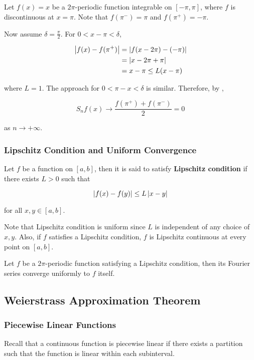 \documentclass[a4paper,12pt]{article}
\begin{document}
\begin{exm}
  Let $f(x)=x$ be a $2\pi$-periodic function integrable on $[-\pi,\pi]$, where $f$ is discontinuous at $x=\pi$. Note that $f(\pi^{-})=\pi$ and $f(\pi^{+})=-\pi$.\n
  
  Now assume $\delta=\frac{\pi}{2}$. For $0<x-\pi<\delta$,

  $$\begin{aligned}[t]
    \left| f(x)-f(\pi^{+})\right|&=\left| f(x-2\pi)-(-\pi)\right|\\
    &=\left| x-2\pi+\pi\right|\\
    &=x-\pi\leq L(x-\pi)
  \end{aligned}$$\s

  where $L=1$. The approach for $0<\pi-x<\delta$ is similar. Therefore, by \rpst[\sctd{1}],
  
  $$S_{n}f(x)\to\frac{f(\pi^{+})+f(\pi^{-})}{2}=0$$\s

  as $n\to+\infty$.
\end{exm}

\subsubsection{Lipschitz Condition and Uniform Convergence}
\begin{dft}
  Let $f$ be a function on $[a,b]$, then it is said to satisfy \textbf{Lipschitz condition} if there exists $L>0$ such that

  $$\left| f(x)-f(y)\right|\leq L\left| x-y\right|$$\s

  for all $x,y\in[a,b]$.
\end{dft}\n

Note that Lipschitz condition is uniform since $L$ is independent of any choice of $x,y$. Also, if $f$ satisfies a Lipschitz condition, $f$ is Lipschitz continuous at every point on $[a,b]$.\n

\begin{pst}
  Let $f$ be a $2\pi$-periodic function satisfying a Lipschitz condition, then its Fourier series converge uniformly to $f$ itself.
\end{pst}

\subsection{Weierstrass Approximation Theorem}
\subsubsection{Piecewise Linear Functions}
Recall that a continuous function is piecewise linear if there exists a partition such that the function is linear within each subinterval.\n
\end{document}
